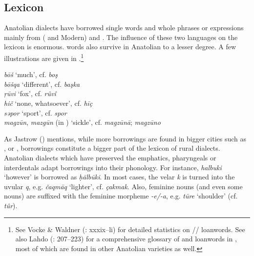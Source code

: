 \documentclass[output=paper]{langsci/langscibook}
\begin{document}
\subsection{Lexicon}

Anatolian  dialects have borrowed single words and whole phrases or expressions mainly from ( and Modern)  and . The influence of these two languages on the  lexicon is enormous.  words also survive in Anatolian  to a lesser degree. A few illustrations are given in .\footnote{See Vocke \& Waldner (\citeyear{VockeWaldner1982}: xxxix--li) for detailed statistics on // {loanwords}. See also Lahdo (\citeyear{Lahdo2009}: 207--223) for a comprehensive glossary of  and  {loanwords} in  , most of which are found in other Anatolian  varieties as well.}


\ea \label{lex}
\noindent \textit{b\={o}\v{s}} `much', cf.  \textit{bo\c{s}}\\
\textit{b\={o}\v{s}qa} `different', cf.  \textit{ba\c{s}ka}\\
\textit{\d{r}\={u}vi} `fox', cf.  \textit{rûvî}\\
\textit{hi\v{c}} `none, whatsoever', cf.  \textit{hī\c{c}}\\
\textit{səpor} `sport', cf.  \textit{spor}\\
\textit{magz\={u}n}, \textit{mazg\={u}n} (in ) `sickle', cf.  \textit{magz\={u}n\={a}};  \textit{magz\={u}no}\\
\z

\noindent As Jastrow (\citeyear[95]{Jastrow2011anatolian}) mentions, while more  borrowings are found in bigger cities such as ,  or ,  borrowings constitute a bigger part of the lexicon of rural dialects. Anatolian  dialects which have preserved the emphatics, {pharyngeals} or interdentals adapt borrowings into their phonology. For instance,  \textit{halbuki} `however' is borrowed as \textit{\d{h}\={a}lb\={u}ki}. In most cases, the velar \textit{k} is turned into the uvular \textit{q}, e.g. \textit{\v{c}aqm\={a}q} `lighter', cf.  \textit{\c{c}akmak}. Also,  feminine nouns (and even some  nouns) are suffixed with the  feminine morpheme \textit{-e/-a}, e.g. \textit{t\={u}re} `shoulder' (cf.  \textit{t\^{u}r}).
\end{document}
